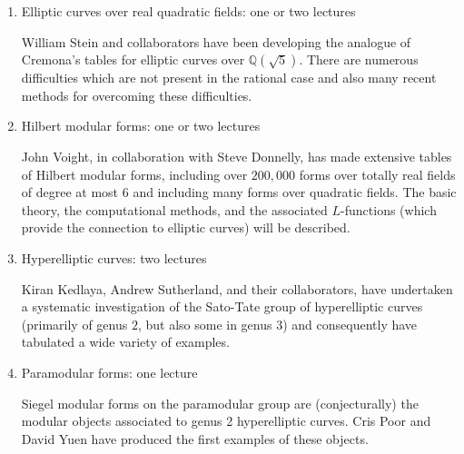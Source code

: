 \documentclass[12pt]{amsart}
\numberwithin{equation}{section}
\newcommand{\Q}{\mathbb Q}
\begin{document}
\begin{enumerate}
\item  Elliptic curves over real quadratic fields: one or two lectures

\noindent
William Stein and collaborators have been developing the analogue of
Cremona's tables for elliptic curves over $\Q(\sqrt{5})$.  There are
numerous difficulties which are not present in the rational case
and also many recent methods for overcoming these difficulties.


\item Hilbert modular forms: one or two lectures

\noindent
John Voight, in collaboration with Steve Donnelly, 
has made extensive tables of Hilbert modular forms,
including over $200{,}000$ forms over totally real fields of degree at
most $6$ and including 
many forms over quadratic fields.  The basic
theory, the computational methods, and the associated $L$-functions
(which provide the connection to elliptic curves) will be
described.


\item  Hyperelliptic curves: two lectures

\noindent
Kiran Kedlaya, Andrew Sutherland, and their collaborators, have
undertaken a systematic investigation of the Sato-Tate group of 
hyperelliptic curves (primarily of genus $2$, but also some in genus $3$)
and consequently have tabulated a wide variety
of examples.



\item  Paramodular forms: one lecture

\noindent
Siegel modular forms on the paramodular group are (conjecturally) the
modular objects associated to genus 2 hyperelliptic curves.
Cris Poor and David Yuen have produced the first examples of these
objects.  


\end{enumerate}
\end{document}
